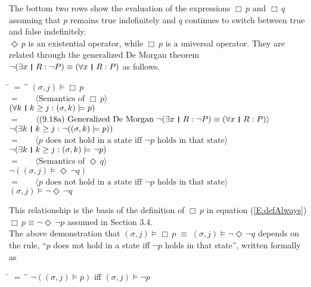 \documentclass[fleqn, leqno]{article}
\newcommand{\lgap}{2pt}                             %
\newcommand{\mymathindent}{24pt}                    %
\newcommand{\equivs}{\ensuremath{\;\equiv\;}}       %
\newcommand{\Event}{\Diamond\,}
\newcommand{\Always}{\Box\,}
\newcommand{\myqedtab}{\hspace{388.5pt}}              %
\newcommand{\thedr}{\rule[-.25ex]{.32mm}{1.75ex}}   %
\newcommand{\dr}{\;\,\thedr\,\;}                    %
\newcommand{\rb}{:}                                 %
\newcommand{\all}{\forall}                          %
\newcommand{\ext}{\exists}                          %
\newcommand{\Gll} {\langle}                         %
\newcommand{\Ggg} {\rangle}                         %
\newcommand{\Hint}[1]     {\ \ \ $\Gll              \mbox{#1} \Ggg$ }   %
\begin{document}
The bottom two rows show the evaluation of the expressions $\Always p$ and $\Always q$
assuming that $p$ remains true indefinitely and $q$ continues to switch between true and false indefinitely.\\

$\Event p$ is an existential operator, while $\Always p$ is a universal operator.
They are related through the generalized De Morgan theorem $\neg (\ext x\dr R\rb \neg P)\equiv (\all x\dr R\rb P)$
as follows.

\begin{tabbing}
\hspace{\mymathindent} \= $= \;$ \= \myqedtab \= \kill
	\> \>   $(\sigma, j) \models \Always p$\\[\lgap]
	\> $=$  \>  \Hint{Semantics of $\Always p$}\\[\lgap]
	\> \>   $(\all k \dr k \ge j \rb (\sigma,k) \models p)$\\[\lgap]
	\> $=$  \>  \Hint{(9.18a) Generalized De Morgan $\neg (\ext x\dr R\rb \neg P)\equiv (\all x\dr R\rb P)$}\\[\lgap]
	\> \>   $\neg (\ext k \dr k \ge j \rb \neg((\sigma,k) \models p))$\\[\lgap]
	\> $=$  \>  \Hint{$p$ does not hold in a state iff $\neg p$ holds in that state}\\[\lgap]
	\> \>   $\neg (\ext k \dr k \ge j \rb (\sigma,k) \models \neg p)$\\[\lgap]
	\> $=$  \>  \Hint{Semantics of $\Event q$}\\[\lgap]
	\> \>   $\neg ((\sigma, j) \models \Event \neg q)$\\[\lgap]
	\> $=$  \>  \Hint{$p$ does not hold in a state iff $\neg p$ holds in that state}\\[\lgap]
	\> \>   $(\sigma, j) \models \neg \Event \neg q$
\end{tabbing}

This relationship is the basis of the definition of $\Always p$ in equation (\ref{E:defAlways})
$\Always p \equiv \neg\Event\neg p$ assumed in Section 3.4.\\

The above demonstration that $(\sigma, j) \models \Always p \equivs (\sigma, j) \models \neg \Event \neg q$ depends on the
rule, ``$p$ does not hold in a state iff $\neg p$ holds in that state'', written formally as

\begin{tabbing}
\hspace{\mymathindent} \= $= \;$ \= \myqedtab \= \kill
  \> $\neg ((\sigma, j) \models p)$ \quad iff \quad $(\sigma, j) \models \neg p$
\end{tabbing}
\end{document}
